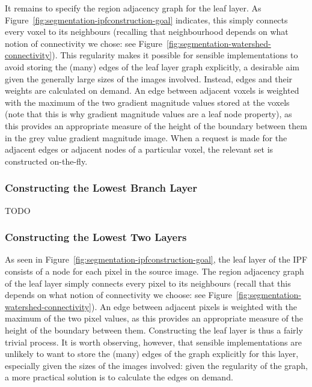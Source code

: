 It remains to specify the region adjacency graph for the leaf layer. As Figure~\ref{fig:segmentation-ipfconstruction-goal} indicates, this simply connects every voxel to its neighbours (recalling that neighbourhood depends on what notion of connectivity we chose: see Figure~\ref{fig:segmentation-watershed-connectivity}). This regularity makes it possible for sensible implementations to avoid storing the (many) edges of the leaf layer graph explicitly, a desirable aim given the generally large sizes of the images involved. Instead, edges and their weights are calculated on demand. An edge between adjacent voxels is weighted with the maximum of the two gradient magnitude values stored at the voxels (note that this is why gradient magnitude values are a leaf node property), as this provides an appropriate measure of the height of the boundary between them in the grey value gradient magnitude image. When a request is made for the adjacent edges or adjacent nodes of a particular voxel, the relevant set is constructed on-the-fly.

\subsubsection{Constructing the Lowest Branch Layer}

TODO

\subsubsection{Constructing the Lowest Two Layers}

As seen in Figure~\ref{fig:segmentation-ipfconstruction-goal}, the leaf layer of the IPF consists of a node for each pixel in the source image. The region adjacency graph of the leaf layer simply connects every pixel to its neighbours (recall that this depends on what notion of connectivity we choose: see Figure~\ref{fig:segmentation-watershed-connectivity}). An edge between adjacent pixels is weighted with the maximum of the two pixel values, as this provides an appropriate measure of the height of the boundary between them. Constructing the leaf layer is thus a fairly trivial process. It is worth observing, however, that sensible implementations are unlikely to want to store the (many) edges of the graph explicitly for this layer, especially given the sizes of the images involved: given the regularity of the graph, a more practical solution is to calculate the edges on demand.

